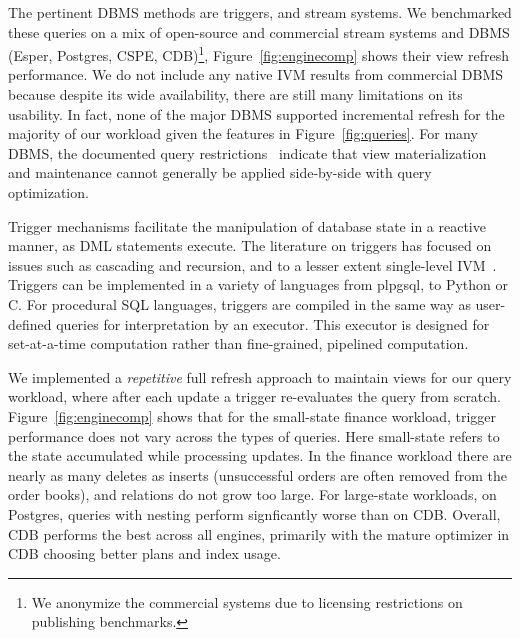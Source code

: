 The pertinent DBMS methods are triggers, and stream systems.
We benchmarked these queries on a mix of open-source and commercial stream
systems and DBMS (Esper, Postgres, CSPE, CDB)\footnote{We anonymize the
commercial systems due to licensing restrictions on publishing benchmarks.},
Figure~\ref{fig:enginecomp} shows their view refresh performance.
We do not include any native IVM results from commercial DBMS because despite
its wide availability, there are still many limitations on its usability.
In fact, none of the major DBMS supported incremental refresh for the
majority of our workload given the features in Figure~\ref{fig:queries}.
For many DBMS, the documented query
restrictions~\cite{db2-viewrestrict,mssql-viewrestrict,oracle-viewrestrict}
indicate that view materialization and maintenance cannot generally be applied
side-by-side with query optimization.

\vspace{1mm}
Trigger mechanisms facilitate the manipulation of database state in a reactive
manner, as DML statements execute.
The literature on triggers has focused on issues such as cascading and
recursion, and to a lesser extent single-level IVM~\cite{baralis-rids95}.
Triggers can be implemented in a variety of languages from plpgsql, to Python or
C. For procedural SQL languages, triggers are compiled in the same way as
user-defined queries for interpretation by an executor.
This executor is designed for set-at-a-time computation rather than
fine-grained, pipelined computation. 

We implemented a \textit{repetitive} full refresh approach to maintain views for
our query workload, where after each update a trigger re-evaluates the query
from scratch.
Figure~\ref{fig:enginecomp} shows that for the small-state finance workload,
trigger performance does not vary across the types of queries. Here small-state
refers to the state accumulated while processing updates. In the finance
workload there are nearly as many deletes as inserts (unsuccessful orders are
often removed from the order books), and relations do not grow too large. For
large-state workloads, on Postgres, queries with nesting perform signficantly
worse than on CDB. Overall, CDB performs the best across all engines, primarily
with the mature optimizer in CDB choosing better plans and index usage.

